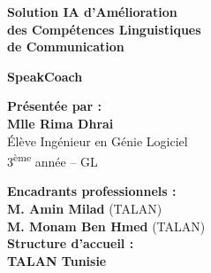 \documentclass[12pt,a4paper]{report}
\begin{document}
\begin{titlepage}
\vspace{0.6cm}

\noindent\makebox[\textwidth]{%
  \color{esprit-pink}\rule{0.5\textwidth}{3pt}%
  \color{talan-blue}\rule{0.5\textwidth}{3pt}%
}

\vspace{0.8cm}

\begin{center}
{\huge\bfseries\color{talan-blue}
Solution IA d'Amélioration\\[0.3cm]
des Compétences Linguistiques\\[0.3cm]
de Communication}

\vspace{0.6cm}
{\huge\bfseries\color{talan-green} SpeakCoach}
\end{center}

\vspace{0.8cm}

\noindent\makebox[\textwidth]{%
  \color{talan-blue}\rule{0.5\textwidth}{3pt}%
  \color{esprit-pink}\rule{0.5\textwidth}{3pt}%
}

\vspace{1.2cm}

\noindent
\begin{minipage}[t]{0.45\textwidth}
\textbf{\textcolor{talan-blue}{\large Présentée par :}}\\[0.2cm]
\textbf{\large Mlle Rima Dhrai}\\[0.1cm]
\textcolor{section-gray}{\small Élève Ingénieur en Génie Logiciel\\
3\textsuperscript{ème} année -- GL}
\end{minipage}
\hfill
\begin{minipage}[t]{0.48\textwidth}
\textbf{\textcolor{talan-blue}{\large Encadrants professionnels :}}\\[0.2cm]
\textbf{M. Amin Milad} \hfill \textcolor{section-gray}{\small (TALAN)}\\
\textbf{M. Monam Ben Hmed} \hfill \textcolor{section-gray}{\small (TALAN)}\\[0.4cm]
\textbf{\textcolor{talan-blue}{\large Structure d'accueil :}}\\[0.1cm]
\textbf{TALAN Tunisie}
\end{minipage}

\vfill

\noindent
\colorbox{talan-blue!90}{}

\end{titlepage}
\end{document}
